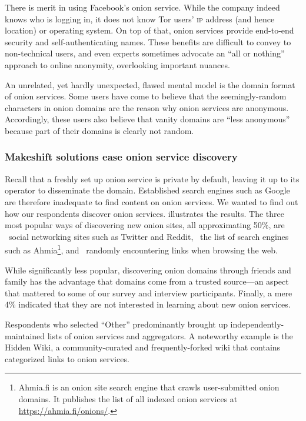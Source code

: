 There is merit in using Facebook's onion service.  While the company indeed
knows who is logging in, it does not know Tor users' \textsc{ip} address (and
hence location) or operating system.  On top of that, onion services provide
end-to-end security and self-authenticating names.  These benefits are difficult
to convey to non-technical users, and even experts sometimes advocate an ``all or
nothing'' approach to online anonymity, overlooking important nuances.

An unrelated, yet hardly unexpected, flawed mental model is the domain format of
onion services.  Some users have come to believe that the seemingly-random
characters in onion domains are the reason why onion services are anonymous.
Accordingly, these users also believe that vanity domains are ``less anonymous''
because part of their domains is clearly not random.

\subsubsection{Makeshift solutions ease onion service discovery}

Recall that a freshly set up onion service is private by default, leaving it up
to its operator to disseminate the domain.  Established search engines such as
Google are therefore inadequate to find content on onion services.  We wanted to
find out how our respondents discover onion services.
 illustrates the results.  The three most popular ways
of discovering new onion sites, all approximating 50\%, are \first~social
networking sites such as Twitter and Reddit, \second~the list of search engines
such as Ahmia\footnote{Ahmia.fi is an onion site search engine that crawls
user-submitted onion domains.  It publishes the list of all indexed onion
services at \url{https://ahmia.fi/onions/}.}, and \third~randomly encountering
links when browsing the web.

While significantly less popular, discovering onion domains through friends and
family has the advantage that domains come from a trusted source---an aspect
that mattered to some of our survey and interview participants.  Finally, a mere
4\% indicated that they are not interested in learning about new onion services.

Respondents who selected ``Other'' predominantly brought up
independently-maintained lists of onion services and aggregators.  A noteworthy
example is the Hidden Wiki, a community-curated and frequently-forked wiki that
contains categorized links to onion services.

